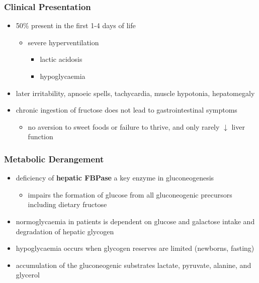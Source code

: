 \documentclass[12pt]{scrartcl}
\begin{document}
\subsubsection{Clinical Presentation}
\label{sec:orgd8e08be}
\begin{itemize}
\item 50\% present in the first 1-4 days of life
\begin{itemize}
\item severe hyperventilation
\begin{itemize}
\item lactic acidosis
\item hypoglycaemia
\end{itemize}
\end{itemize}
\item later irritability, apnoeic spells, tachycardia, muscle hypotonia, hepatomegaly
\item chronic ingestion of fructose does not lead to gastrointestinal symptoms
\begin{itemize}
\item no aversion to sweet foods or failure to thrive, and only rarely \(\downarrow\) liver function
\end{itemize}
\end{itemize}

\subsubsection{Metabolic Derangement}
\label{sec:orgf3feab8}
\begin{itemize}
\item deficiency of \textbf{hepatic FBPase} a key enzyme in gluconeogenesis
\begin{itemize}
\item impairs the formation of glucose from all gluconeogenic precursors
including dietary fructose
\end{itemize}
\end{itemize}

\begin{itemize}
\item normoglycaemia in patients is dependent on glucose and galactose
intake and degradation of hepatic glycogen
\item hypoglycaemia occurs when glycogen reserves are limited (newborns, fasting)
\item accumulation of the gluconeogenic substrates lactate, pyruvate, alanine, and glycerol
\end{itemize}
\end{document}

